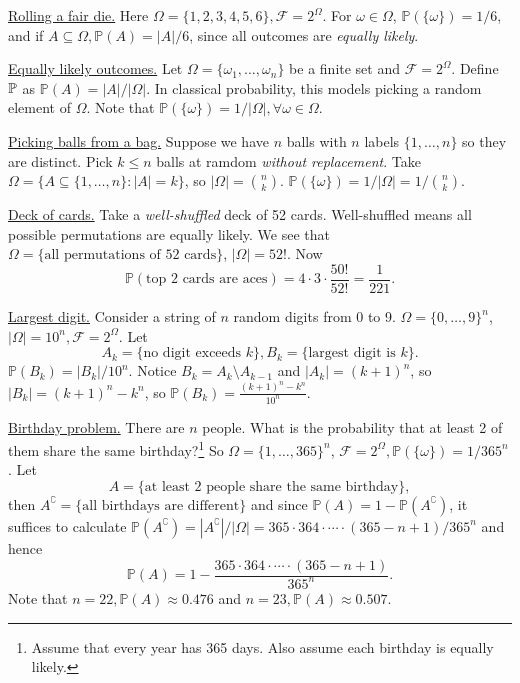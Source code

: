 \begin{example}
    \underline{Rolling a fair die.} Here $ \Omega = \{1,2,3,4,5,6\}, \mathscr{F} = 2^\Omega $. For $ \omega\in \Omega$, $\mathbb{P}(\{\omega\})=1/6 $, and if $ A \subseteq \Omega, \mathbb{P}(A)=|A|/6 $, since all outcomes are \textit{equally likely}.
\end{example}
\begin{example}
    \underline{Equally likely outcomes.} Let $ \Omega = \{\omega_1,\dots, \omega_n\} $ be a finite set and $ \mathscr{F}=2^\Omega $. Define ${\mathbb{P}}$ as $ \mathbb{P}(A)=|A|/|\Omega| $. In classical probability, this models picking a random element of $ \Omega $. Note that $ \mathbb{P}(\{\omega\})=1/|\Omega|, \forall \omega\in \Omega $.
\end{example}
\begin{example}
    \underline{Picking balls from a bag.} Suppose we have $n$ balls with $n$ labels $ \{1,\dots,n\} $ so they are distinct. Pick $k\le n$ balls at ramdom \textit{without replacement}. Take $ \Omega = \{A \subseteq \{1,\dots,n\}: |A|=k\} $, so $ |\Omega|=\binom{n}{k} $. $ \mathbb{P}(\{\omega\}) = 1/|\Omega| = 1/\binom{n}{k} $.
\end{example}
\begin{example}
    \underline{Deck of cards.} Take a \textit{well-shuffled} deck of 52 cards. Well-shuffled means all possible permutations are equally likely. We see that $ \Omega = \{\text{all permutations of 52 cards}\}$, $|\Omega|=52! $. Now
    \[
        \mathbb{P}(\text{top 2 cards are aces}) = 4 \cdot 3 \cdot \frac{50!}{52!} =\frac{1}{221}.
    \]
\end{example}
\begin{example}
    \underline{Largest digit.} Consider a string of $n$ random digits from 0 to 9. $ \Omega = \{0,\dots,9\}^n $, $ |\Omega| = 10^n, \mathscr{F}=2^\Omega  $. Let 
    \[
         A_k = \{\text{no digit exceeds }k\}, B_k =\{\text{largest digit is }k\} .
    \]
    $ \mathbb{P}(B_k) = |B_k|/10^n $. Notice $ B_k = A_k \setminus A_{k-1} $ and $ |A_k| = (k+1)^n $, so $ |B_k|=(k+1)^n-k^n $, so $ \mathbb{P}(B_k) = \frac{(k+1)^n-k^n}{10^n} $.
\end{example}
\begin{example}
    \underline{Birthday problem.} There are $n$ people. What is the probability that at least 2 of them share the same birthday?\footnote{Assume that every year has 365 days. Also assume each birthday is equally likely.} So $ \Omega = \{1,\dots,365\}^n $, $ \mathscr{F} = 2^\Omega, \mathbb{P}(\{\omega\}) = 1/365^n $. Let 
    \[
        A=\{\text{at least 2 people share the same birthday}\} ,
    \]
     then $ A^\complement = \{\text{all birthdays are different}\} $ and since $ \mathbb{P}(A)=1-\mathbb{P}(A^\complement) $, it suffices to calculate $ \mathbb{P}(A^\complement) = |A^\complement|/|\Omega| = 365 \cdot 364 \cdot \cdots \cdot (365-n+1)/365^n $ and hence 
    \[
        \mathbb{P}(A) = 1-\frac{365 \cdot 364 \cdot \cdots \cdot (365-n+1)}{365^n}.
    \]
    Note that $n=22, \mathbb{P}(A) \approx 0.476$ and $ n=23, \mathbb{P}(A)\approx 0.507 $. 
\end{example}

